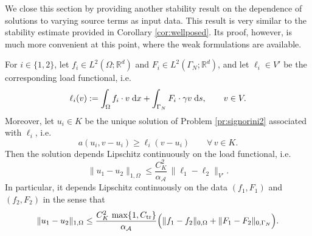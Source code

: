 We close this section by providing another stability result on the dependence of solutions to varying source terms as input data. This result is very similar to the stability estimate provided in Corollary \ref{cor:wellposed}. Its proof, however, is much more convenient at this point, where the weak formulations are available.

\begin{proposition}\label{pr:lipschitz}
	For $i\in\{1,2\}$, let $f_i\in L^2(\Omega;\mathbb R^d)$ and $F_i\in L^2(\Gamma_N;\mathbb R^d)$, and let $\ell_i\in V'$ be the corresponding load functional, i.e.
	\begin{equation*}
		\ell_i(v):=\int_\Omega f_i\cdot v\;{{\mathrm{d}} x}+\int_{\Gamma_N} F_i\cdot \gamma v\;{{\mathrm{d}} s},
		\qquad v\in V.
	\end{equation*}
	Moreover, let $u_i\in K$ be the unique solution of Problem \ref{pr:signorini2} associated with $\ell_i$, i.e.
	\begin{equation*}
		a(u_i,v-u_i)\ge \ell_i(v-u_i)\qquad \forall\, v\in K.
	\end{equation*}
	Then the solution depends Lipschitz continuously on the load functional, i.e.
	\begin{equation}\label{eq:lipschitzabstract}
		\|u_1-u_2\|_{1,\Omega}\le \frac{C_K^2}{\alpha_\mathcal{A}}\,\|\ell_1-\ell_2\|_{V'}.
	\end{equation}
	In particular, it depends Lipschitz continuously on the data $(f_1, F_1)$ and $(f_2, F_2)$ in the sense that
	\begin{equation}\label{eq:lipschitzloads}
		\|u_1-u_2\|_{1,\Omega}
		\le \frac{C_K^2\,\max\{1,C_\mathrm{tr}\}}{\alpha_\mathcal{A}}
		\Bigl(\|f_1-f_2\|_{0,\Omega}+\|F_1-F_2\|_{0,\Gamma_N}\Bigr).
	\end{equation}
\end{proposition}

